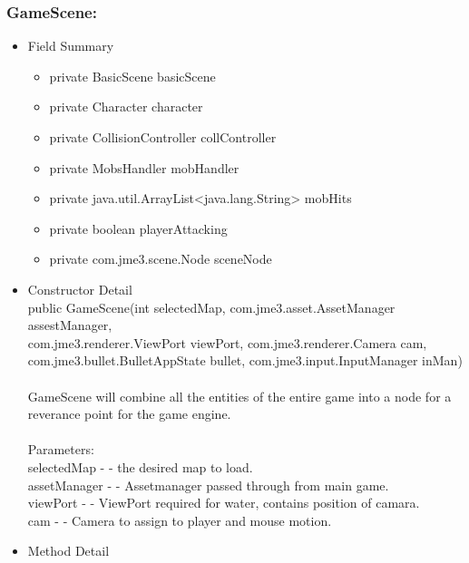 \documentclass[letterpaper]{article}
\begin{document}
						\subsubsection*{GameScene:}
						\vspace{0.1in}
							\begin{itemize}
								\item	Field Summary
										\begin{itemize}
											\item	private BasicScene	basicScene 
											\item	private Character	character 
											\item	private CollisionController	collController 
											\item	private MobsHandler	mobHandler 
											\item	private java.util.ArrayList<java.lang.String>	mobHits 
											\item	private boolean	playerAttacking 
											\item	private com.jme3.scene.Node	sceneNode 
										\end{itemize}
								\item	Constructor Detail \\
										public GameScene(int selectedMap, com.jme3.asset.AssetManager assestManager,\\
										         com.jme3.renderer.ViewPort viewPort,
										         com.jme3.renderer.Camera cam, \\
										         com.jme3.bullet.BulletAppState bullet,
										         com.jme3.input.InputManager inMan) \\ \\
										GameScene will combine all the entities of the entire game into a node for a reverance point for the game engine. \\ \\
										Parameters: \\
										selectedMap - - the desired map to load. \\
										assetManager - - Assetmanager passed through from main game. \\
										viewPort - - ViewPort required for water, contains position of camara. \\
										cam - - Camera to assign to player and mouse motion.
								\item	Method Detail
										\begin{itemize}

\end{itemize}
\end{itemize}
\end{document}
